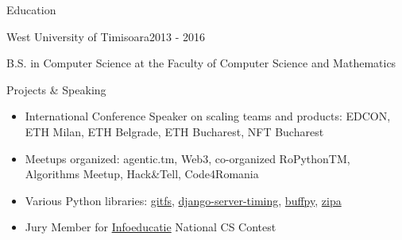 \documentclass{resume}
\begin{document}
\begin{rSection}{Education}
    \begin{rSubsection}{West University of Timisoara}{2013 - 2016}{}{}
    \item B.S. in Computer Science at the Faculty of Computer Science and Mathematics
    \end{rSubsection}
\end{rSection}

\begin{rSection}{Projects \& Speaking}
    \begin{itemize}
       \setlength\itemsep{-0.3em}
       \item International Conference Speaker on scaling teams and products: EDCON, ETH Milan, ETH Belgrade, ETH Bucharest, NFT Bucharest
       \item Meetups organized: agentic.tm, Web3, co-organized RoPythonTM, Algorithms Meetup, Hack\&Tell, Code4Romania
       \item Various Python libraries: \href{https://github.com/presslabs/gitfs}{gitfs}, \href{https://github.com/vtemian/django-server-timing}{django-server-timing}, \href{https://github.com/vtemian/buffpy}{buffpy}, \href{https://github.com/presslabs/zipa}{zipa}
       \item Jury Member for \href{https://infoeducatie.ro}{Infoeducatie} National CS Contest
    \end{itemize}
\end{rSection}
\end{document}
